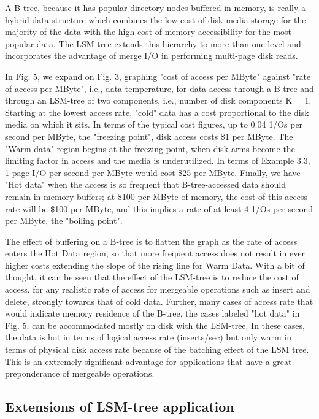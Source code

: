 \documentclass[a4paper,11pt,notitlepage,twoside,openright]{article}
\begin{document}
A B-tree, because it has popular directory nodes buffered in memory, is
really a hybrid data structure which combines the low cost of disk media
storage for the majority of the data with the high cost of memory
accessibility for the most popular data. The LSM-tree extends this
hierarchy to more than one level and incorporates the advantage of merge
I/O in performing multi-page disk reads.

In Fig. 5, we expand on Fig. 3, graphing "cost of access per MByte"
against "rate of access per MByte", i.e., data temperature, for data
access through a B-tree and through an LSM-tree of two components, i.e.,
number of disk components K = 1. Starting at the lowest access rate,
"cold" data has a cost proportional to the disk media on which it sits.
In terms of the typical cost figures, up to 0.04 1/Os per second per
MByte, the "freezing point", disk access costs \$1 per MByte. The "Warm
data" region begins at the freezing point, when disk arms become the
limiting factor in access and the media is underutilized. In terms of
Example 3.3, 1 page I/O per second per MByte would cost \$25 per MByte.
Finally, we have "Hot data" when the access is so frequent that
B-tree-accessed data should remain in memory buffers; at \$100 per MByte
of memory, the cost of this access rate will be \$100 per MByte, and
this implies a rate of at least 4 1/Os per second per MByte, the
"boiling point".

The effect of buffering on a B-tree is to flatten the graph as the rate
of access enters the Hot Data region, so that more frequent access does
not result in ever higher costs extending the slope of the rising line
for Warm Data. With a bit of thought, it can be seen that the effect of
the LSM-tree is to reduce the cost of access, for any realistic rate of
access for mergeable operations such as insert and delete, strongly
towards that of cold data. Further, many cases of access rate that would
indicate memory residence of the B-tree, the cases labeled "hot data" in
Fig. 5, can be accommodated mostly on disk with the LSM-tree. In these
cases, the data is hot in terms of logical access rate (inserts/sec) but
only warm in terms of physical disk access rate because of the batching
effect of the LSM tree. This is an extremely significant advantage for
applications that have a great preponderance of mergeable operations.


\hypertarget{extensions-of-lsm-tree-application}{%
\subsection{Extensions of LSM-tree
application}\label{extensions-of-lsm-tree-application}}
\end{document}

